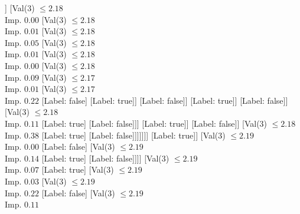 \documentclass[margin=10pt]{standalone}
\begin{document}
\begin{forest}
																							[Val($3$) $ \leq 2.17$ \\ Imp. $0.01$
																								[Val($3$) $ \leq 2.17$ \\ Imp. $0.44$
																									[Label: false]
																									[Label: true]]
																								[Val($3$) $ \leq 2.18$ \\ Imp. $0.00$
																									[Val($3$) $ \leq 2.18$ \\ Imp. $0.01$
																										[Val($3$) $ \leq 2.18$ \\ Imp. $0.05$
																											[Val($3$) $ \leq 2.18$ \\ Imp. $0.01$
																												[Val($3$) $ \leq 2.18$ \\ Imp. $0.00$
																													[Val($3$) $ \leq 2.18$ \\ Imp. $0.09$
																														[Val($3$) $ \leq 2.17$ \\ Imp. $0.01$
																															[Val($3$) $ \leq 2.17$ \\ Imp. $0.22$
																																[Label: false]
																																[Label: true]]
																															[Label: false]]
																														[Label: true]]
																													[Label: false]]
																												[Val($3$) $ \leq 2.18$ \\ Imp. $0.11$
																													[Label: true]
																													[Label: false]]]
																											[Label: true]]
																										[Label: false]]
																									[Val($3$) $ \leq 2.18$ \\ Imp. $0.38$
																										[Label: true]
																										[Label: false]]]]]]]
																				[Label: true]]
																			[Val($3$) $ \leq 2.19$ \\ Imp. $0.00$
																				[Label: false]
																				[Val($3$) $ \leq 2.19$ \\ Imp. $0.14$
																					[Label: true]
																					[Label: false]]]]
																		[Val($3$) $ \leq 2.19$ \\ Imp. $0.07$
																			[Label: true]
																			[Val($3$) $ \leq 2.19$ \\ Imp. $0.03$
																				[Val($3$) $ \leq 2.19$ \\ Imp. $0.22$
																					[Label: false]
																					[Val($3$) $ \leq 2.19$ \\ Imp. $0.11$

\end{forest}
\end{document}
